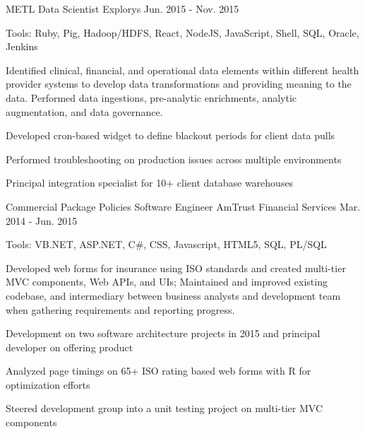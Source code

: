 \begin{cventries}
  \cvexpentry
    {METL} %
    {Data Scientist}
    {Explorys}
    {Jun. 2015 - Nov. 2015}
    {
      \begin{cvheavyparagraph}
        Tools: Ruby, Pig, Hadoop/HDFS, React, NodeJS, JavaScript, Shell, SQL, Oracle, Jenkins
      \end{cvheavyparagraph}
    }
    {
      \begin{cvparagraph}
        Identified clinical, financial, and operational data elements within different health provider systems to develop data transformations and providing meaning to the data. Performed data ingestions, pre-analytic enrichments, analytic augmentation, and data governance.
      \end{cvparagraph}
      \begin{cvitems} %
        \item {Developed cron-based widget to define blackout periods for client data pulls}
        \item {Performed troubleshooting on production issues across multiple environments}
        \item {Principal integration specialist for 10+ client database warehouses}
      \end{cvitems}
    }

  \cvexpentry
    {Commercial Package Policies}
    {Software Engineer} %
    {AmTrust Financial Services}
    {Mar. 2014 - Jun. 2015}
    {
      \begin{cvheavyparagraph}
        Tools: VB.NET, ASP.NET, C\#, CSS, Javascript, HTML5, SQL, PL/SQL
      \end{cvheavyparagraph}
    }
    {
      \begin{cvparagraph}
        Developed web forms for insurance using ISO standards and created multi-tier MVC components, Web APIs, and UIs; Maintained and improved existing codebase,  and intermediary between business analysts and development team when gathering requirements and reporting progress.
      \end{cvparagraph}
      \begin{cvitems} %
        \item {Development on two software architecture projects in 2015 and principal developer on offering product}
        \item {Analyzed page timings on 65+ ISO rating based web forms with R for optimization efforts}
        \item {Steered development group into a unit testing project on multi-tier MVC components}
      \end{cvitems}
    }


\end{cventries}
